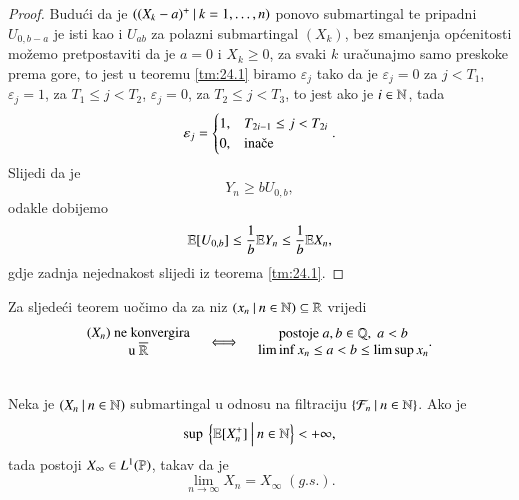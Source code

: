 \begin{proof}
    Budu\' ci da je $({(X_k - a)^+} \: | \: {k = 1, \ldots, n})$ ponovo submartingal te pripadni $U_{0, b - a}$ je isti kao i $U_{a b}$ za polazni submartingal $(X_k)$, bez smanjenja op\' cenitosti mo\v zemo pretpostaviti da je $a = 0$ i $X_k \geq 0$, za svaki $k$ ura\v cunajmo samo preskoke prema gore, to jest u teoremu \ref{tm:24.1} biramo $\varepsilon_j$ tako da je $\varepsilon_j = 0$ za $j < T_1$, $\varepsilon_j = 1$, za $T_1 \leq j < T_2$, $\varepsilon_j = 0$, za $T_2 \leq j < T_3$, to jest ako je $i \in \mathbb{N}$, tada
    \begin{equation*}
        \varepsilon_j =
        \begin{cases}
            1 ,& T_{2 i - 1} \leq j < T_{2 i}\\
            0 ,& \textnormal{ina\v ce}
        \end{cases}.
    \end{equation*}
    Slijedi da je
    \begin{equation*}
        Y_n \geq b U_{0, b},
    \end{equation*}
    odakle dobijemo
    \begin{equation*}
        \mathbb{E} [U_{0, b}] \leq \frac{1}{b} \mathbb{E} Y_n \leq \frac{1}{b} \mathbb{E} X_n,
    \end{equation*}
    gdje zadnja nejednakost slijedi iz teorema \ref{tm:24.1}.
\end{proof}

Za sljede\' ci teorem uo\v cimo da za niz $({x_n} \: | \: {n \in \mathbb{N}}) \subseteq \mathbb{R}$ vrijedi
\begin{equation}    \label{jed:24.3}
    \begin{matrix}
        (X_n) \textnormal{ ne konvergira}\\
        \textnormal{u } \overline{\mathbb{R}}
    \end{matrix}
    \quad \iff \quad
    \begin{matrix}
        \textnormal{postoje } a, b \in \mathbb{Q}, \; a < b\\
        \liminf x_n \leq a < b \leq \limsup x_n
    \end{matrix}.
\end{equation}

\begin{tm}   \label{tm:24.4}
    \quad \\
    Neka je $({X_n} \: | \: {n \in \mathbb{N}})$ submartingal u odnosu na filtraciju $\{{\mathcal{F}_n} \: | \: {n \in \mathbb{N}}\}$.
    Ako je
    \begin{equation*}
        \sup \: \Big\{{\mathbb{E} [ X_n^+]} \: \Big| \: {n \in \mathbb{N}}\Big\} < +\infty,
    \end{equation*}
    tada postoji $X_\infty \in L^1(\mathbb{P})$, takav da je
    \begin{equation*}
        \lim\limits_{n \to \infty} X_n = X_\infty \; (g.s.).
    \end{equation*}
\end{tm}

